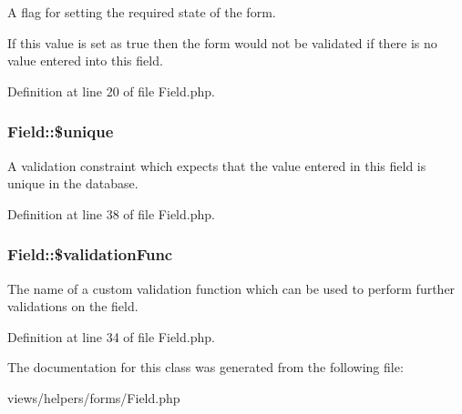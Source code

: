 A flag for setting the required state of the form. 

If this value is set as true then the form would not be validated if there is no value entered into this field. 

Definition at line 20 of file Field.php.

\hypertarget{class_field_ad82d237d3764f3789ca71fa6ab67b171}{
\subsubsection[{\$unique}]{\setlength{\rightskip}{0pt plus 5cm}Field::\$unique}}
\label{class_field_ad82d237d3764f3789ca71fa6ab67b171}


A validation constraint which expects that the value entered in this field is unique in the database. 



Definition at line 38 of file Field.php.

\hypertarget{class_field_ad9706349922ca48c0bf9ca7cc2f8b208}{
\subsubsection[{\$validationFunc}]{\setlength{\rightskip}{0pt plus 5cm}Field::\$validationFunc}}
\label{class_field_ad9706349922ca48c0bf9ca7cc2f8b208}


The name of a custom validation function which can be used to perform further validations on the field. 



Definition at line 34 of file Field.php.



The documentation for this class was generated from the following file:\begin{DoxyCompactItemize}
\item 
views/helpers/forms/Field.php\end{DoxyCompactItemize}
